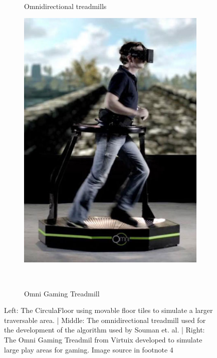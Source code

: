 \begin{figure}
\begin{subfigure}[b]{0.38\columnwidth}
		\caption{Omnidirectional treadmills}~\label{fig:omniTread}
	\end{subfigure}
	\begin{subfigure}[b]{0.21\columnwidth}
		\includegraphics[width=\textwidth]{./figures/422px-Virtuix_Omni_Skyrim_(cropped)}
		\caption{Omni Gaming Treadmill}~\label{fig:virtuixOmni}
	\end{subfigure}
	\caption[]{Left: The CirculaFloor using movable floor tiles to simulate a larger traversable area. | Middle: The omnidirectional treadmill used for the development of the algorithm used by Souman et. al. | Right: The Omni Gaming Treadmil from Virtuix developed to simulate large play areas for gaming. Image source in footnote 4\textcolor{white}{\footnotemark[4]}}
\end{figure}

